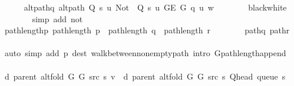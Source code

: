 \begin{isabellebody}
\ \ \ \ \isamarkupfalse%
\ alt{\isacharunderscore}{\kern0pt}path{\isacharunderscore}{\kern0pt}q{\isacharcolon}{\kern0pt}\ {\isachardoublequoteopen}alt{\isacharunderscore}{\kern0pt}path\ {\isacharparenleft}{\kern0pt}Q\ s\ u{\isacharparenright}{\kern0pt}\ {\isacharparenleft}{\kern0pt}Not\ {\isasymcirc}\ Q\ s\ u{\isacharparenright}{\kern0pt}\ {\isacharparenleft}{\kern0pt}G{\isachardot}{\kern0pt}E\ G{\isacharparenright}{\kern0pt}\ q\ u\ w{\isachardoublequoteclose}\isanewline
\ \ \ \ \ \ \isamarkupfalse%
\ black{\isacharunderscore}{\kern0pt}white\isanewline
\ \ \ \ \ \ \isamarkupfalse%
\ {\isacharparenleft}{\kern0pt}simp\ add{\isacharcolon}{\kern0pt}\ not{\isacharunderscore}{\kern0pt}{\isacharparenleft}{\kern0pt}{}{\isacharparenright}{\kern0pt}{\isacharparenright}{\kern0pt}\isanewline
\ \ \ \ \isamarkupfalse%
\ path{\isacharunderscore}{\kern0pt}length{\isacharunderscore}{\kern0pt}p{\isacharcolon}{\kern0pt}\ {\isachardoublequoteopen}path{\isacharunderscore}{\kern0pt}length\ p\ {\isacharequal}{\kern0pt}\ path{\isacharunderscore}{\kern0pt}length\ q\ {\isacharplus}{\kern0pt}\ path{\isacharunderscore}{\kern0pt}length\ r{\isachardoublequoteclose}\isanewline
\ \ \ \ \ \ \isamarkupfalse%
\ path{\isacharunderscore}{\kern0pt}q\ path{\isacharunderscore}{\kern0pt}r\isanewline
\ \ \ \ \ \ \isamarkupfalse%
\ {\isacharparenleft}{\kern0pt}auto\ simp\ add{\isacharcolon}{\kern0pt}\ p\ dest{\isacharcolon}{\kern0pt}\ walk{\isacharunderscore}{\kern0pt}between{\isacharunderscore}{\kern0pt}nonempty{\isacharunderscore}{\kern0pt}path{\isacharparenleft}{\kern0pt}{}{\isacharminus}{\kern0pt}{}{\isacharparenright}{\kern0pt}\ intro{\isacharcolon}{\kern0pt}\ G{\isachardot}{\kern0pt}path{\isacharunderscore}{\kern0pt}length{\isacharunderscore}{\kern0pt}append{\isacharunderscore}{\kern0pt}{}{\isacharparenright}{\kern0pt}\isanewline
\isanewline
\ \ \ \ \isamarkupfalse%
\ {\isachardoublequoteopen}d\ {\isacharparenleft}{\kern0pt}parent\ {\isacharparenleft}{\kern0pt}alt{\isacharunderscore}{\kern0pt}fold\ G{}\ G{}\ src\ s{\isacharparenright}{\kern0pt}{\isacharparenright}{\kern0pt}\ v\ {\isacharequal}{\kern0pt}\ d\ {\isacharparenleft}{\kern0pt}parent\ {\isacharparenleft}{\kern0pt}alt{\isacharunderscore}{\kern0pt}fold\ G{}\ G{}\ src\ s{\isacharparenright}{\kern0pt}{\isacharparenright}{\kern0pt}\ {\isacharparenleft}{\kern0pt}Q{\isacharunderscore}{\kern0pt}head\ {\isacharparenleft}{\kern0pt}queue\ s{\isacharparenright}{\kern0pt}{\isacharparenright}{\kern0pt}\ {\isacharplus}{\kern0pt}\ {}{\isachardoublequoteclose}\isanewline

\end{isabellebody}
